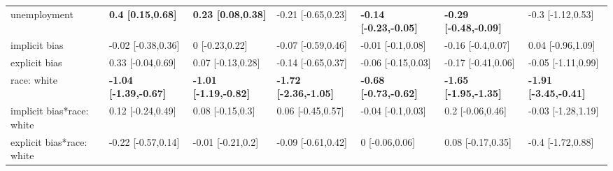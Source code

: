 \documentclass[]{article}
\theoremstyle{definition}
\theoremstyle{definition}
\theoremstyle{remark}
\begin{document}
\begin{landscape}
\begin{table}
{\begin{tabular}[t]{lllllll}
unemployment & \textbf{0.4 [0.15,0.68]} & \textbf{0.23 [0.08,0.38]} & -0.21 [-0.65,0.23] & \textbf{-0.14 [-0.23,-0.05]} & \textbf{-0.29 [-0.48,-0.09]} & -0.3 [-1.12,0.53]\\
implicit bias & -0.02 [-0.38,0.36] & 0 [-0.23,0.22] & -0.07 [-0.59,0.46] & -0.01 [-0.1,0.08] & -0.16 [-0.4,0.07] & 0.04 [-0.96,1.09]\\
\addlinespace
explicit bias & 0.33 [-0.04,0.69] & 0.07 [-0.13,0.28] & -0.14 [-0.65,0.37] & -0.06 [-0.15,0.03] & -0.17 [-0.41,0.06] & -0.05 [-1.11,0.99]\\
race: white & \textbf{-1.04 [-1.39,-0.67]} & \textbf{-1.01 [-1.19,-0.82]} & \textbf{-1.72 [-2.36,-1.05]} & \textbf{-0.68 [-0.73,-0.62]} & \textbf{-1.65 [-1.95,-1.35]} & \textbf{-1.91 [-3.45,-0.41]}\\
implicit bias*race: white & 0.12 [-0.24,0.49] & 0.08 [-0.15,0.3] & 0.06 [-0.45,0.57] & -0.04 [-0.1,0.03] & 0.2 [-0.06,0.46] & -0.03 [-1.28,1.19]\\
explicit bias*race: white & -0.22 [-0.57,0.14] & -0.01 [-0.21,0.2] & -0.09 [-0.61,0.42] & 0 [-0.06,0.06] & 0.08 [-0.17,0.35] & -0.4 [-1.72,0.88]\\
\bottomrule
\end{tabular}}
\end{table}
\end{landscape}
\end{document}
